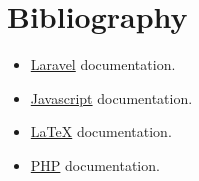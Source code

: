 \chapter{Bibliography}
\begin{itemize}
	\item \href{https://laraveles.com/documentacion/}{Laravel} documentation.
	\item \href{https://developer.mozilla.org/es/docs/Web/JavaScript}{Javascript} documentation.
	\item \href{https://es.wikibooks.org/wiki/Manual_de_LaTeX/Texto_completo}{\LaTeX} documentation.
	\item \href{https://www.php.net/manual/es/index.php}{PHP} documentation.
\end{itemize}